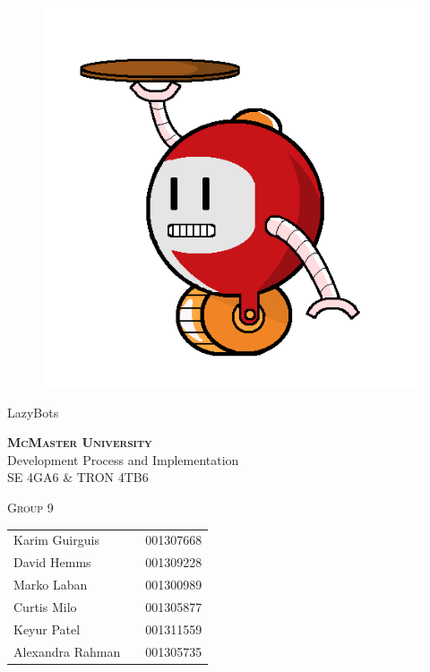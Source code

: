 \documentclass [10pt]{article}
\begin{document}
\begin {center} 

\thispagestyle{empty}
\vspace*{5cm}

\begin {figure}[h!]
\centering
\hspace{-10mm}\includegraphics [scale = .3, trim={.4cm 0 .8cm 0},clip] {figures/alfred.png}
\end {figure}

{%
\Huge{LazyBots} }

\vspace{1 cm}
{\Large\textbf{\textsc{McMaster University}}\\}  \vspace {1cm}
{\Large Development Process and Implementation\\ \vspace {0.4 cm} SE 4GA6 \& TRON 4TB6}  \vspace {1cm}

{\large \textsc{Group 9} \\} \vspace{1cm}



\begin{tabular}{ l c  l}
Karim Guirguis & & 001307668 \\
David Hemms & & 001309228 \\
Marko Laban & & 001300989 \\
Curtis Milo & & 001305877 \\
Keyur Patel & & 001311559 \\
Alexandra Rahman & & 001305735
\end{tabular}


\end{center}
\end{document}
